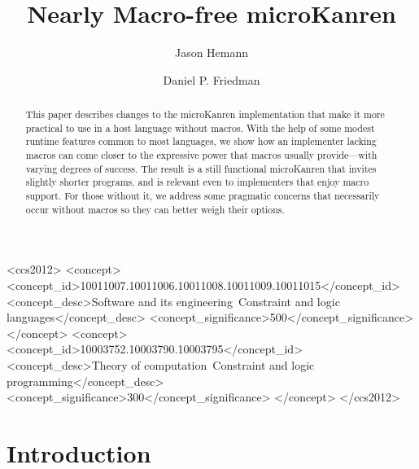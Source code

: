 \documentclass[sigplan,draft,balance,pbalance,natbib=false]{acmart}
\begin{document}
\title{Nearly Macro-free microKanren}

\author{Jason Hemann}
\author{Daniel P. Friedman}

\renewcommand{\shortauthors}{Hemann et al.}

\begin{abstract}

  This paper describes changes to the microKanren implementation that
  make it more practical to use in a host language without macros.
  With the help of some modest runtime features common to most
  languages, we show how an implementer lacking macros can come closer
  to the expressive power that macros usually provide---with varying
  degrees of success. The result is a still functional microKanren
  that invites slightly shorter programs, and is relevant even to
  implementers that enjoy macro support. For those without it, we
  address some pragmatic concerns that necessarily occur without
  macros so they can better weigh their options.

\end{abstract}

\begin{CCSXML}
<ccs2012>
   <concept>
       <concept_id>10011007.10011006.10011008.10011009.10011015</concept_id>
       <concept_desc>Software and its engineering~Constraint and logic languages</concept_desc>
       <concept_significance>500</concept_significance>
   </concept>
   <concept>
       <concept_id>10003752.10003790.10003795</concept_id>
       <concept_desc>Theory of computation~Constraint and logic programming</concept_desc>
       <concept_significance>300</concept_significance>
   </concept>
 </ccs2012>
\end{CCSXML}



\maketitle

\section{Introduction}
\end{document}
